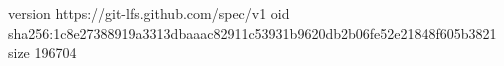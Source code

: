 version https://git-lfs.github.com/spec/v1
oid sha256:1c8e27388919a3313dbaaac82911c53931b9620db2b06fe52e21848f605b3821
size 196704
